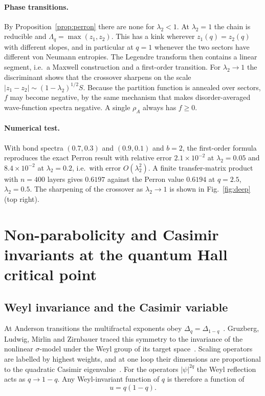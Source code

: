 \documentclass[11pt]{article}
\theoremstyle{definition}\newtheorem{definition}{Definition}[section]
\theoremstyle{remark}\newtheorem*{remark}{Remark}
\begin{document}
\paragraph{Phase transitions.} By Proposition~\ref{prop:perron} there are none for $\lambda_2<1$. At $\lambda_2=1$
the chain is reducible and $\Lambda_q=\max(z_1,z_2)$. This has a kink wherever $z_1(q)=z_2(q)$ with different
slopes, and in particular at $q=1$ whenever the two sectors have different von Neumann entropies. The
Legendre transform then contains a linear segment, i.e.\ a Maxwell construction and a first-order transition.
For $\lambda_2\to1$ the discriminant shows that the crossover sharpens on the scale
$|z_1-z_2|\sim(1-\lambda_2)^{1/2}S$. Because the partition function is annealed over sectors, $f$ may become
negative, by the same mechanism that makes disorder-averaged wave-function spectra negative. A single
$\rho_A$ always has $f\ge0$.

\paragraph{Numerical test.} With bond spectra $(0.7,0.3)$ and $(0.9,0.1)$ and $b=2$, the first-order formula
reproduces the exact Perron result with relative error $2.1\times10^{-2}$ at $\lambda_2=0.05$ and $8.4\times10^{-2}$
at $\lambda_2=0.2$, i.e.\ with error $O(\lambda_2^2)$. A finite transfer-matrix product with $n=400$ layers gives
$0.6197$ against the Perron value $0.6194$ at $q=2.5$, $\lambda_2=0.5$. The sharpening of the crossover as
$\lambda_2\to1$ is shown in Fig.~\ref{fig:deep} (top right).

\section{Non-parabolicity and Casimir invariants at the quantum Hall critical point}
\label{sec:qh}

\subsection{Weyl invariance and the Casimir variable}
At Anderson transitions the multifractal exponents obey $\Delta_q=\Delta_{1-q}$~\cite{MFME}. Gruzberg,
Ludwig, Mirlin and Zirnbauer traced this symmetry to the invariance of the nonlinear $\sigma$-model under the
Weyl group of its target space~\cite{GLMZ}. Scaling operators are labelled by highest weights, and at one loop
their dimensions are proportional to the quadratic Casimir eigenvalue~\cite{GMZ}. For the operators
$|\psi|^{2q}$ the Weyl reflection acts as $q\to1-q$. Any Weyl-invariant function of $q$ is therefore a
function of
\begin{equation}
u=q(1-q).
\end{equation}
\end{document}
